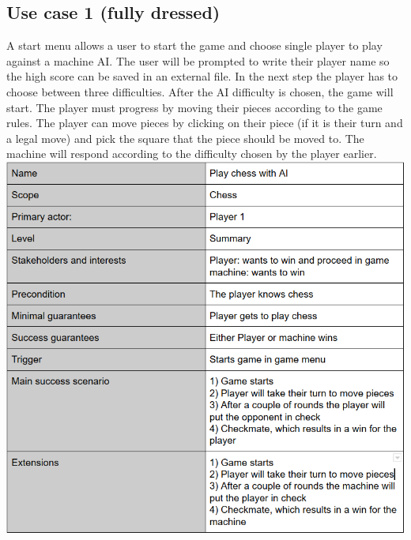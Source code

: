\documentclass{article}
\begin{document}
        \subsection{Use case 1 (fully dressed)}
        A start menu allows a user to start the game and choose single player to
        play against a machine AI. The user will be prompted to write their player
        name so the high score can be saved in an external file. In the next step
        the player has to choose between three difficulties. After the AI difficulty
        is chosen, the game will start. The player must progress by moving their
        pieces according to the game rules. The player can move pieces by clicking
        on their piece (if it is their turn and a legal move) and pick the square that
        the piece should be moved to. The machine will respond according to the 
        difficulty chosen by the player earlier. \\
        \includegraphics[width=\linewidth]{play-ai.png}
        
\end{document}
